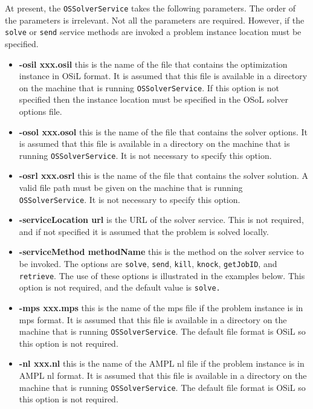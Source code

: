\documentclass[11pt]{article}
\renewcommand{\_}{{\char"5F}}
\renewcommand{\{}{{\char"7B}}
\renewcommand{\}}{{\char"7D}}
\renewcommand{\^}{{\char"0D}}
\renewcommand{\'}{{\char"0D}}
\begin{document}
At present, the {\tt OSSolverService} takes the following parameters. The order of the parameters is irrelevant.  Not all the parameters are required. However, if the {\tt solve} or {\tt send} service methods are invoked a problem instance location must be specified.

\begin{itemize}

\item[] {\bf -osil xxx.osil}  this is the name of the file that contains the optimization instance in OSiL format. It is assumed that this file is available in a directory on the machine that is running {\tt OSSolverService}. If this option is not specified then the instance location must be specified in the OSoL solver options file.

\item[] {\bf -osol xxx.osol}  this is the name of the file that contains the solver options. It is assumed that this file is available in a directory on the machine that is running {\tt OSSolverService}. It is not necessary to specify this option.

\item[] {\bf -osrl xxx.osrl}  this is the name of the file that contains the solver solution. A valid file path must be given on the machine that is running {\tt OSSolverService}. It is not necessary to specify this option.

\item[] {\bf -serviceLocation url}  is the URL of the solver service. This is not required, and if not specified it is assumed that the problem is solved locally.

\item[] {\bf -serviceMethod  methodName}  this is  the method on the solver service to be invoked. The options are {\tt solve}, {\tt send}, {\tt kill}, {\tt knock}, {\tt getJobID}, and {\tt retrieve}. The use of these options is illustrated in the examples below. This option is not required, and the default value is {\tt solve.}

\item[] {\bf -mps  xxx.mps}  this is the name of the mps file if the problem instance is in mps format. It is assumed that this file is available in a directory on the machine that is running {\tt OSSolverService}. The default file format is OSiL so this option is not required.

\item[] {\bf -nl  xxx.nl}  this is the name of the AMPL nl file if the problem instance is in AMPL nl  format. It is assumed that this file is available in a directory on the machine that is running {\tt OSSolverService}. The default file format is OSiL so this option is not required.


\end{itemize}
\end{document}

